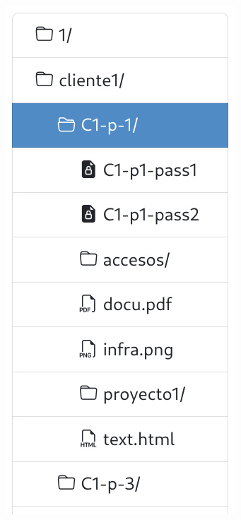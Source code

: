 \documentclass{\ClassPath/viu-tfm-template}
\begin{document}
{\begin{minipage}{0.3\linewidth}
    \includegraphics[width=0.9\linewidth]{img/tree2.png}
\end{minipage}
\hfill
\begin{minipage}{0.3\linewidth}

\end{minipage}}
\end{document}
